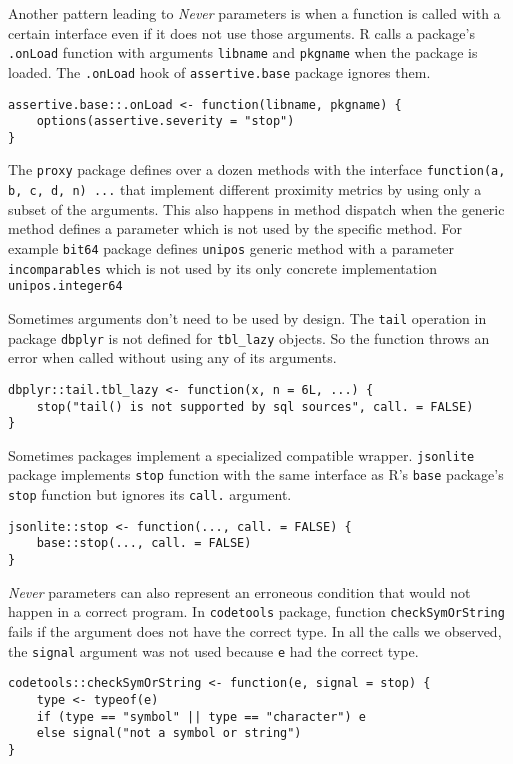 \documentclass[review,nonacm,screen,acmsmall,anonymous=true]{acmart}
\newcommand{\never}{\emph{Never}\xspace}
\newcommand{\code}[1]{\lstinline |#1|\xspace}
\begin{document}
Another pattern leading to \never parameters is when a function is called with a
certain interface even if it does not use those arguments. R calls a package's
\code{.onLoad} function with arguments \code{libname} and \code{pkgname} when
the package is loaded. The \code{.onLoad} hook of \code{assertive.base} package
ignores them.
\begin{lstlisting}
assertive.base::.onLoad <- function(libname, pkgname) {
    options(assertive.severity = "stop")
}
\end{lstlisting}

The \code{proxy} package defines over a dozen methods with the interface
\code{function(a, b, c, d, n) ...} that implement different proximity metrics by
using only a subset of the arguments.
This also happens in method dispatch when the generic method defines a parameter
which is not used by the specific method. For example \code{bit64} package
defines \code{unipos} generic method with a parameter \code{incomparables} which
is not used by its only concrete implementation \code{unipos.integer64}


Sometimes arguments don't need to be used by design.
The \code{tail} operation in package \code{dbplyr} is not defined for
\code{tbl_lazy} objects. So the function throws an error when called without
using any of its arguments.
\begin{lstlisting}
dbplyr::tail.tbl_lazy <- function(x, n = 6L, ...) {
    stop("tail() is not supported by sql sources", call. = FALSE)
}
\end{lstlisting}

Sometimes packages implement a specialized compatible wrapper.
\code{jsonlite} package implements \code{stop} function with the same interface
as R's \code{base} package's \code{stop} function but ignores its \code{call.}
argument.
\begin{lstlisting}
jsonlite::stop <- function(..., call. = FALSE) {
    base::stop(..., call. = FALSE)
}
\end{lstlisting}

\never parameters can also represent an erroneous condition that would not
happen in a correct program. In \code{codetools} package, function
\code{checkSymOrString} fails if the argument does not have the correct type. In
all the calls we observed, the \code{signal} argument was not used because
\code{e} had the correct type.
\begin{lstlisting}
codetools::checkSymOrString <- function(e, signal = stop) {
    type <- typeof(e)
    if (type == "symbol" || type == "character") e
    else signal("not a symbol or string")
}
\end{lstlisting}
\end{document}
